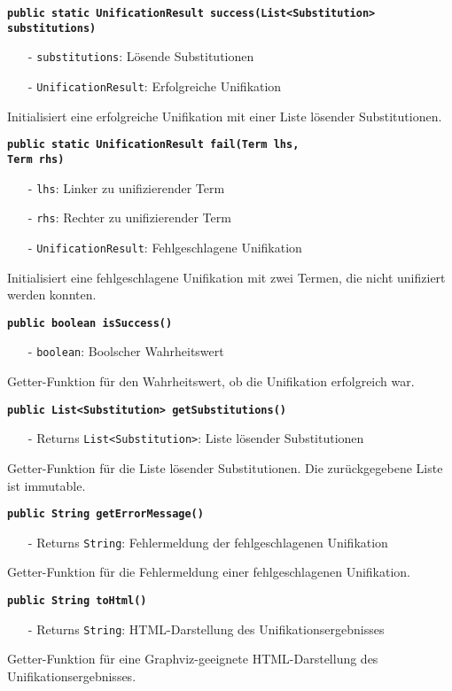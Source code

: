 \documentclass[parskip=full,11pt,twoside]{scrartcl}
\begin{document}
\textbf{\texttt{public static UnificationResult success(List<Substitution>\\substitutions)}}
\begin{itemize}[noitemsep]
	\item[-] \texttt{substitutions}: Lösende Substitutionen
	\item[-] \texttt{UnificationResult}: Erfolgreiche Unifikation
\end{itemize}
Initialisiert eine erfolgreiche Unifikation mit einer Liste lösender Substitutionen.

\textbf{\texttt{public static UnificationResult fail(Term lhs,\\Term rhs)}}
\begin{itemize}[noitemsep]
	\item[-] \texttt{lhs}: Linker zu unifizierender Term
	\item[-] \texttt{rhs}: Rechter zu unifizierender Term
	\item[-] \texttt{UnificationResult}: Fehlgeschlagene Unifikation
\end{itemize}
Initialisiert eine fehlgeschlagene Unifikation mit zwei Termen, die nicht unifiziert werden konnten.

\textbf{\texttt{public boolean isSuccess()}}
\begin{itemize}[noitemsep]
	\item[-] \texttt{boolean}: Boolscher Wahrheitswert
\end{itemize}
Getter-Funktion für den Wahrheitswert, ob die Unifikation erfolgreich war.

\textbf{\texttt{public List<Substitution> getSubstitutions()}}
\begin{itemize}[noitemsep]
	\item[-] Returns \texttt{List<Substitution>}: Liste lösender Substitutionen
\end{itemize}
Getter-Funktion für die Liste lösender Substitutionen. Die zurückgegebene Liste ist immutable.

\textbf{\texttt{public String getErrorMessage()}}
\begin{itemize}[noitemsep]
	\item[-] Returns \texttt{String}: Fehlermeldung der fehlgeschlagenen Unifikation
\end{itemize}
Getter-Funktion für die Fehlermeldung einer fehlgeschlagenen Unifikation.

\textbf{\texttt{public String toHtml()}}
\begin{itemize}[noitemsep]
	\item[-] Returns \texttt{String}: HTML-Darstellung des Unifikationsergebnisses
\end{itemize}
Getter-Funktion für eine Graphviz-geeignete HTML-Darstellung des Unifikationsergebnisses.
\end{document}
